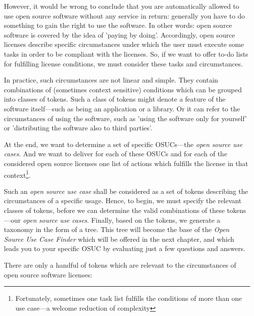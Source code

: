 However, it would be wrong to conclude that you are automatically allowed to use
open source software without any service in return: generally you have to do
something to gain the right to use the software. In other words: open source
software is covered by the idea of ’paying by doing’. Accordingly, open source
li\-cen\-ses describe specific circumstances under which the user must execute
some tasks in order to be compliant with the licenses. So, if we want to offer
to-do lists for fulfilling license conditions, we must consider these tasks and
circumstances.

In practice, such circumstances are not linear and simple. They contain
combinations of (sometimes context sensitive) conditions which can be grouped
into classes of tokens. Such a class of tokens might denote a feature of the
software itself---such as being an application or a library. Or it can refer to
the circumstances of using the software, such as 'using the software only for
yourself' or 'distributing the software also to third parties'.

At the end, we want to determine a set of specific OSUCs---the \emph{open source
use cases}. And we want to deliver for each of these OSUCs and for each of the
considered open source licenses one list of actions which fulfills the license
in that context\footnote{Fortunately, sometimes one task list fulfills the
conditions of more than one use case---a welcome reduction of complexity}.

Such an \emph{open source use case} shall be considered as a set of tokens
describing the circumstances of a specific usage. Hence, to begin, we must
specify the relevant classes of tokens, before we can determine the valid
combinations of these tokens---our \emph{open source use cases}. Finally, based
on the tokens, we generate a taxonomy in the form of a tree. This tree will
become the base of the \emph{Open Source Use Case Finder} which will be offered
in the next chapter, and which leads you to your specific OSUC by evaluating
just a few questions and answers.

There are only a handful of tokens which are relevant to the circumstances of
open source software licenses:

